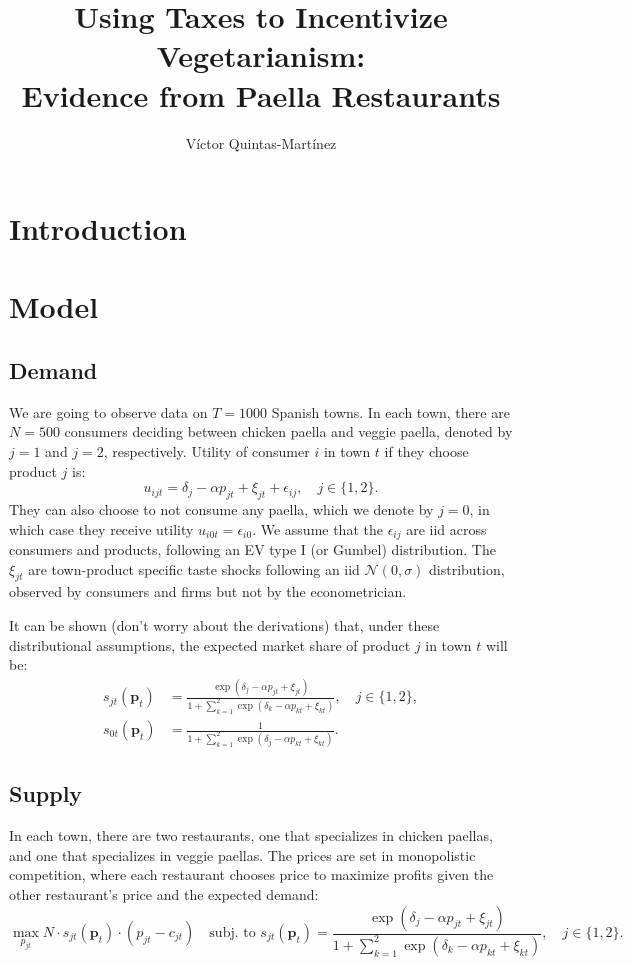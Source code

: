 \documentclass[11pt]{article}
\title{Using Taxes to Incentivize Vegetarianism: \\ Evidence from Paella Restaurants}
\author{Víctor Quintas-Martínez}
\begin{document}
\maketitle

\begin{abstract}
\lipsum[1]
\end{abstract}

\section{Introduction}
\lipsum[1-10]

\section{Model}
\subsection{Demand}
We are going to observe data on $T = 1000$ Spanish towns. In each town, there are $N = 500$ consumers deciding between chicken paella and veggie paella, denoted by $j=1$ and $j=2$, respectively. Utility of consumer $i$ in town $t$ if they choose product $j$ is: 
$$u_{ijt} = \delta_j - \alpha p_{jt} + \xi_{jt} + \epsilon_{ij}, \quad j\in\{1,2\}.$$
They can also choose to not consume any paella, which we denote by $j=0$, in which case they receive utility $u_{i0t} = \epsilon_{i0}$. We assume that the $\epsilon_{ij}$ are iid across consumers and products, following an EV type I (or Gumbel) distribution. The $\xi_{jt}$ are town-product specific taste shocks following an iid $\mathcal{N}(0, \sigma)$ distribution, observed by  consumers and firms but not by the econometrician.  

It can be shown (don't worry about the derivations) that, under these distributional assumptions, the expected market share of product $j$ in town $t$ will be:
\begin{align*}
s_{jt}(\mathbf{p}_{t}) & = \frac{\exp(\delta_j - \alpha p_{jt} + \xi_{jt})}{1 + \sum_{k=1}^2 \exp(\delta_k - \alpha p_{kt} + \xi_{kt})}, \quad j\in\{1,2\}, \\ s_{0t}(\mathbf{p}_{t}) & = \frac{1}{1 + \sum_{k=1}^2 \exp(\delta_j - \alpha p_{kt} + \xi_{kt})}. 
\end{align*}

\subsection{Supply}
In each town, there are two restaurants, one that specializes in chicken paellas, and one that specializes in veggie paellas. The prices are set in monopolistic competition, where each restaurant chooses price to maximize profits given the other restaurant's price and the expected demand:
$$\max_{p_{jt}} N \cdot s_{jt}(\mathbf{p}_t) \cdot (p_{jt} - c_{jt}) \quad \text{subj. to } s_{jt}(\mathbf{p}_{t}) = \frac{\exp(\delta_j - \alpha p_{jt} + \xi_{jt})}{1 + \sum_{k=1}^2 \exp(\delta_k - \alpha p_{kt} + \xi_{kt})}, \quad j \in \{1,2\}.$$
\end{document}
